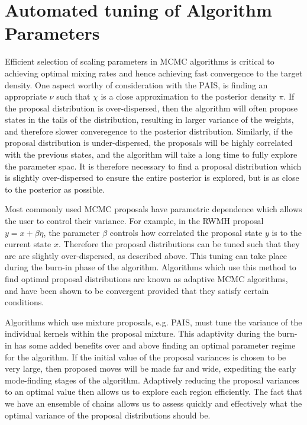 \documentclass[final]{siamltex}
\begin{document}
\section{Automated tuning of Algorithm Parameters}\label{Sec:adapt}

Efficient selection of scaling parameters in MCMC algorithms is
critical to achieving optimal mixing rates and hence achieving fast
convergence to the target density. One aspect worthy of  consideration
with the PAIS, is finding an appropriate $\nu$ such that
$\chi$ is a close approximation to the posterior density $\pi$. If the
proposal distribution is over-dispersed, then the algorithm will often
propose states in the tails of the distribution, resulting in larger
variance of the weights, and therefore slower converegence to the
posterior distribution. Similarly, if the proposal distribution is
under-dispersed, the proposals will be highly correlated with the
previous states, and the algorithm will take a long time to fully explore the parameter spac. It is therefore necessary to find a proposal distribution which is slightly over-dispersed to ensure the entire posterior is explored\cite{gelman1992inference}, but is as close to the posterior as possible.

Most commonly used MCMC proposals have parametric dependence which
allows the user to control their variance. For example, in the RWMH
proposal $y = x + \beta \eta$, the parameter $\beta$ controls how
correlated the proposal state $y$ is to the current state
$x$. Therefore the proposal distributions can be tuned such that they are are slightly over-dispersed, as described
above. This tuning can take place during the burn-in phase of the
algorithm. Algorithms which use this method to find optimal proposal
distributions are known as adaptive MCMC algorithms, and have been
shown to be convergent provided that they satisfy certain conditions\cite{roberts2007coupling,roberts2009examples}.

Algorithms which use mixture proposals, e.g. PAIS, must tune the
variance of the individual kernels within the proposal mixture. This
adaptivity during the burn-in has some added benefits over and above
finding an optimal parameter regime for the algorithm. If the initial
value of the proposal variances is chosen to be very large, then
proposed moves will be made far and wide, expediting the early
mode-finding stages of the algorithm. Adaptively reducing the proposal variances to an
optimal value then allows us to explore each region efficiently. The
fact that we have an ensemble of chains allows us to assess quickly and
effectively what the optimal variance of the proposal distributions
should be.
\end{document}
